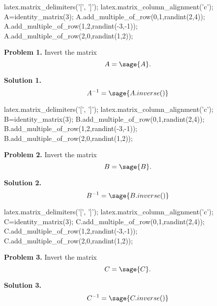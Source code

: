 \documentclass[12pt]{article}
\begin{document}
\begin{sagesilent}
  latex.matrix_delimiters('[', ']');
  latex.matrix_column_alignment('c');
  A=identity_matrix(3);
  A.add_multiple_of_row(0,1,randint(2,4));
  A.add_multiple_of_row(1,2,randint(-3,-1));
  A.add_multiple_of_row(2,0,randint(1,2));
\end{sagesilent}

\textbf{Problem 1.} Invert the matrix $$ A = \sage{A}.$$

\textbf{Solution 1.} $$A^{-1} = \sage{A.inverse()}$$

\dotfill

\begin{sagesilent}
  latex.matrix_delimiters('[', ']');
  latex.matrix_column_alignment('c');
  B=identity_matrix(3);
  B.add_multiple_of_row(0,1,randint(2,4));
  B.add_multiple_of_row(1,2,randint(-3,-1));
  B.add_multiple_of_row(2,0,randint(1,2));
\end{sagesilent}

\textbf{Problem 2.} Invert the matrix $$B = \sage{B}.$$

\textbf{Solution 2.} $$B^{-1} = \sage{B.inverse()}$$

\dotfill

\begin{sagesilent}
  latex.matrix_delimiters('[', ']');
  latex.matrix_column_alignment('c');
  C=identity_matrix(3);
  C.add_multiple_of_row(0,1,randint(2,4));
  C.add_multiple_of_row(1,2,randint(-3,-1));
  C.add_multiple_of_row(2,0,randint(1,2));
\end{sagesilent}

\textbf{Problem 3.} Invert the matrix $$C = \sage{C}.$$

\textbf{Solution 3.} $$C^{-1} = \sage{C.inverse()}$$
\end{document}
